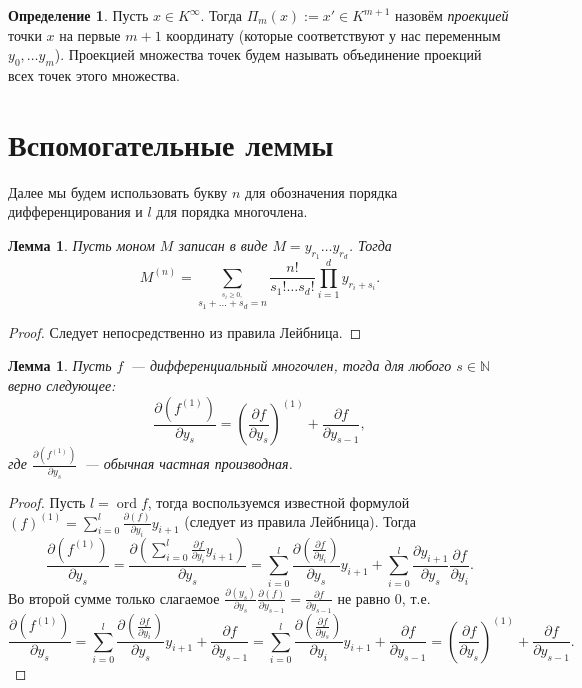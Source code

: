 \documentclass[16pt]{article}
\DeclareMathOperator{\ord}{ord}
\theoremstyle{plain1}
\newtheorem{lemma}[theorem1]{Лемма}
\theoremstyle{plain2}
\theoremstyle{plain}
\theoremstyle{plain3}
\theoremstyle{definition}
\newtheorem{definition}[theorem2]{Определение}
\theoremstyle{remark}
\begin{document}
\begin{definition}
Пусть $x\in K^{\infty}$. Тогда $\Pi_m(x):=x'\in K^{m+1}$ назовём \emph{проекцией}
точки $x$ на первые $m+1$ координату (которые соответствуют у нас
переменным $y_0,\ldots y_m$). Проекцией множества точек будем называть объединение проекций всех точек этого множества.
\end{definition}


\section{Вспомогательные леммы}

Далее мы будем использовать букву $n$ для обозначения порядка дифференцирования и $l$ для порядка многочлена.


\begin{lemma}\label{lemma:der_monom}
Пусть моном $M$ записан в виде $M=y_{r_1}\ldots y_{r_d}$. Тогда
$$
M^{(n)} =\sum\limits_{\stackrel{s_i\geqslant0,}{
s_1+\ldots+s_d=n}}\frac{n!}{s_1!\ldots s_d!}
\prod\limits_{i=1}^dy_{r_i+s_i}.
$$
\end{lemma}
\begin{proof}
Следует непосредственно из правила Лейбница.
\end{proof}


\begin{lemma}\label{lemma:commutative derivatives}
Пусть $f$~--- дифференциальный многочлен, тогда для любого $s\in\mathbb{N}$ верно следующее: 
$$
\frac{\partial(f^{(1)})}{\partial y_s}=\left(\frac{\partial f}{\partial y_s}\right)^{(1)}+\frac{\partial f}{\partial y_{s-1}},
$$
где $\frac{\partial(f^{(1)})}{\partial y_s}$~--- обычная частная производная.
\end{lemma}
\begin{proof}
Пусть $l=\ord f$, тогда воспользуемся известной формулой $(f)^{(1)}=\sum\limits_{i=0}^l\frac{\partial(f)}{\partial y_i}y_{i+1}$ (следует из правила Лейбница). Тогда 
$$
\frac{\partial(f^{(1)})}{\partial y_s}=\frac{\partial(\sum\limits_{i=0}^l\frac{\partial f}{\partial y_i}y_{i+1})}{\partial y_s}=\sum\limits_{i=0}^l\frac{\partial(\frac{\partial f}{\partial y_i})}{\partial y_s}y_{i+1}+\sum\limits_{i=0}^l\frac{\partial y_{i+1}}{\partial y_s}\frac{\partial f}{\partial y_i}.
$$
Во второй сумме только слагаемое 
$\frac{\partial(y_{s})}{\partial y_s}\frac{\partial(f)}{\partial y_{s-1}}=\frac{\partial f}{\partial y_{s-1}}$ 
не равно 0, т.е. 
$$
\frac{\partial(f^{(1)})}{\partial y_s}=\sum\limits_{i=0}^l\frac{\partial(\frac{\partial f}{\partial y_i})}{\partial y_s}y_{i+1}+\frac{\partial f}{\partial y_{s-1}}=\sum\limits_{i=0}^l\frac{\partial(\frac{\partial f}{\partial y_s})}{\partial y_i}y_{i+1}+\frac{\partial f}{\partial y_{s-1}}=\left(\frac{\partial f}{\partial y_s}\right)^{(1)}+\frac{\partial f}{\partial y_{s-1}}.
$$
\end{proof}
\end{document}
